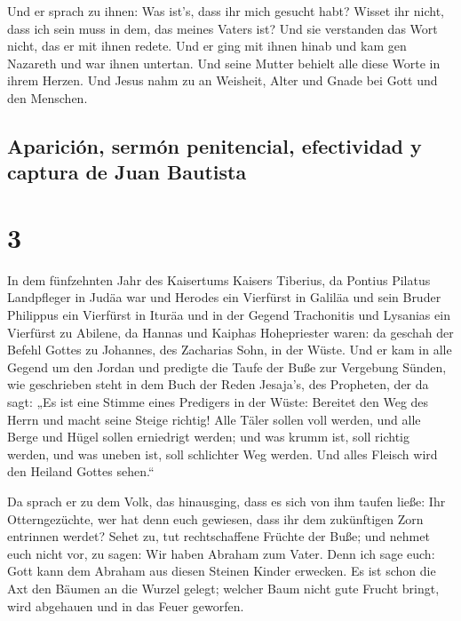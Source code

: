  Und er sprach zu ihnen: Was ist's, dass ihr mich gesucht
habt? Wisset ihr nicht, dass ich sein muss in dem, das meines Vaters
ist?  Und sie verstanden das Wort nicht, das er mit ihnen
redete.  Und er ging mit ihnen hinab und kam gen Nazareth
und war ihnen untertan. Und seine Mutter behielt alle diese Worte in
ihrem Herzen.  Und Jesus nahm zu an Weisheit, Alter und
Gnade bei Gott und den Menschen.

\hypertarget{apariciuxf3n-sermuxf3n-penitencial-efectividad-y-captura-de-juan-bautista}{%
\subsection{Aparición, sermón penitencial, efectividad y captura de Juan
Bautista}\label{apariciuxf3n-sermuxf3n-penitencial-efectividad-y-captura-de-juan-bautista}}

\hypertarget{section-2}{%
\section{3}\label{section-2}}

 In dem fünfzehnten Jahr des Kaisertums Kaisers Tiberius,
da Pontius Pilatus Landpfleger in Judäa war und Herodes ein Vierfürst in
Galiläa und sein Bruder Philippus ein Vierfürst in Ituräa und in der
Gegend Trachonitis und Lysanias ein Vierfürst zu Abilene, 
da Hannas und Kaiphas Hohepriester waren: da geschah der Befehl Gottes
zu Johannes, des Zacharias Sohn, in der Wüste.  Und er kam
in alle Gegend um den Jordan und predigte die Taufe der Buße zur
Vergebung Sünden,  wie geschrieben steht in dem Buch der
Reden Jesaja's, des Propheten, der da sagt: „Es ist eine Stimme eines
Predigers in der Wüste: Bereitet den Weg des Herrn und macht seine
Steige richtig!  Alle Täler sollen voll werden, und alle
Berge und Hügel sollen erniedrigt werden; und was krumm ist, soll
richtig werden, und was uneben ist, soll schlichter Weg werden.
 Und alles Fleisch wird den Heiland Gottes sehen.``

 Da sprach er zu dem Volk, das hinausging, dass es sich
von ihm taufen ließe: Ihr Otterngezüchte, wer hat denn euch gewiesen,
dass ihr dem zukünftigen Zorn entrinnen werdet?  Sehet zu,
tut rechtschaffene Früchte der Buße; und nehmet euch nicht vor, zu
sagen: Wir haben Abraham zum Vater. Denn ich sage euch: Gott kann dem
Abraham aus diesen Steinen Kinder erwecken.  Es ist schon
die Axt den Bäumen an die Wurzel gelegt; welcher Baum nicht gute Frucht
bringt, wird abgehauen und in das Feuer geworfen.

